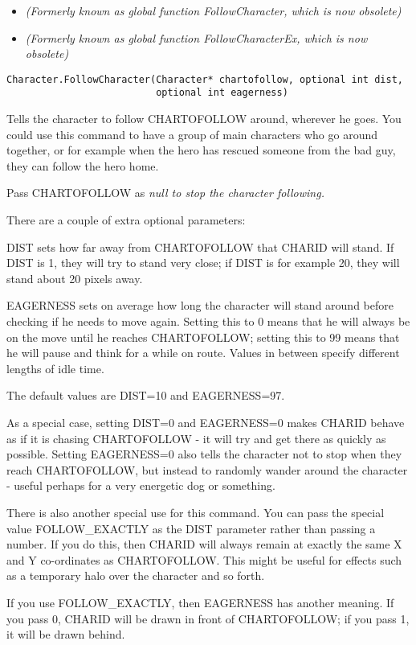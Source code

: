 \begin{itemize}
\item \it{(Formerly known as global function FollowCharacter, which is now obsolete)}
\item \it{(Formerly known as global function FollowCharacterEx, which is now obsolete)}
\end{itemize}

\begin{verbatim}
Character.FollowCharacter(Character* chartofollow, optional int dist,
                          optional int eagerness)
\end{verbatim}
Tells the character to follow CHARTOFOLLOW around, wherever he goes.
You could use this command to have a group of main characters who go around
together, or for example when the hero has rescued someone from the bad
guy, they can follow the hero home.

Pass CHARTOFOLLOW as \it{null} to stop the character following.

There are a couple of extra optional parameters:

DIST sets how far away from CHARTOFOLLOW that CHARID will
stand. If DIST is 1, they will try to stand very close; if DIST is for
example 20, they will stand about 20 pixels away.

EAGERNESS sets on average how long the character will stand around before
checking if he needs to move again. Setting this to 0 means that he will
always be on the move until he reaches CHARTOFOLLOW; setting this to 99
means that he will pause and think for a while on route. Values in between
specify different lengths of idle time.

The default values are DIST=10 and EAGERNESS=97.

As a special case, setting DIST=0 and EAGERNESS=0 makes CHARID behave as if
it is chasing CHARTOFOLLOW - it will try and get there as quickly as possible.
Setting EAGERNESS=0 also tells the character not to stop when they reach
CHARTOFOLLOW, but instead to randomly wander around the character - useful
perhaps for a very energetic dog or something.

There is also another special use for this command. You can pass the special
value FOLLOW_EXACTLY as the DIST parameter rather than passing a number. If you
do this, then CHARID will always remain at exactly the same X and Y co-ordinates
as CHARTOFOLLOW. This might be useful for effects such as a temporary halo over
the character and so forth.

If you use FOLLOW_EXACTLY, then EAGERNESS has another meaning. If you pass 0, CHARID
will be drawn in front of CHARTOFOLLOW; if you pass 1, it will be drawn behind.

